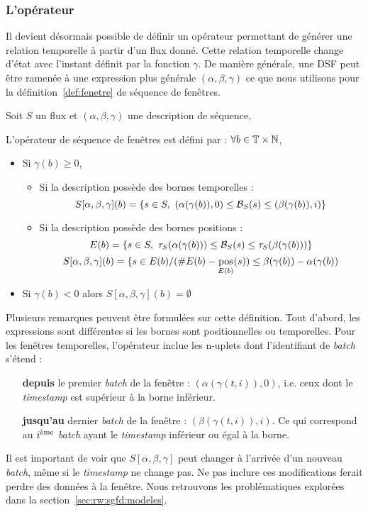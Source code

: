 \subsubsection{L'opérateur}
Il devient désormais possible de définir un opérateur permettant  de générer une relation temporelle à partir d'un flux donné. Cette relation temporelle change d'état avec l'instant définit par la fonction $\gamma$. De manière générale, une DSF peut être ramenée à une expression plus générale $(\alpha,\beta,\gamma)$ ce que nous utilisons pour la définition~\ref{def:fenetre} de séquence de fenêtres.
\begin{defi}\label{def:fenetre}
	Soit $S$ un flux et $(\alpha, \beta, \gamma)$ une description de séquence,
	
	L'opérateur de séquence de fenêtres est défini par : $\forall b \in \mathbb{T}\times\mathbb{N}$, 
	\begin{itemize}
		\item Si $\gamma(b) \geq 0$, 
		\begin{itemize}
			\item Si la description possède des bornes temporelles :
			$$S[\alpha,\beta,\gamma](b) = \left\{s\in S, \ (\alpha(\gamma(b)),0)\leq \BS(s) \leq (\beta(\gamma(b)),i)\right\}$$
			\item Si la description possède des bornes positions :
			$$E(b) = \left\{s\in S, \ \tau_S(\alpha(\gamma(b)))\leq \BS(s) \leq \tau_S(\beta(\gamma(b)))\right\}$$
			$$S[\alpha,\beta,\gamma](b) = \{s \in E(b) / (\#E(b) - \mathop{\mathrm{pos}}_{E(b)}(s)) \leq \beta(\gamma(b)) - \alpha(\gamma(b))$$
		\end{itemize}
		\item Si $\gamma(b) <0$ alors $S[\alpha,\beta,\gamma](b) = \emptyset$
	\end{itemize}
\end{defi}

Plusieurs remarques peuvent être formulées sur cette définition. Tout d'abord, les expressions sont différentes si les bornes sont positionnelles ou temporelles. Pour les fenêtres temporelles, l'opérateur inclue les n-uplets dont l'identifiant de \textit{batch} s'étend :
\begin{itemize}
	\item[\textbf{depuis}] le premier \textit{batch} de la fenêtre : $(\alpha(\gamma(t,i)),0)$, i.e. ceux dont le \textit{timestamp} est supérieur à la borne inférieur.
	\item[\textbf{jusqu'au}] dernier \textit{batch} de la fenêtre : $(\beta(\gamma(t,i)),i)$. Ce qui correspond au $i^{\textrm{\`{e}me}}$ \textit{batch} ayant le \textit{timestamp} inférieur ou égal à la borne.
\end{itemize}
Il est important de voir que $S[\alpha,\beta,\gamma]$ peut changer à l'arrivée d'un nouveau \textit{batch}, même si le \textit{timestamp} ne change pas. Ne pas inclure ces modifications ferait perdre des données à la fenêtre. Nous retrouvons les problématiques explorées dans la section~\ref{sec:rw:sgfd:modeles}.

